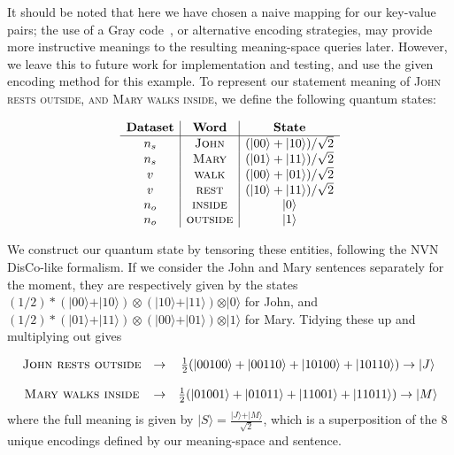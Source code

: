 It should be noted that here we have chosen a naive mapping for our key-value pairs; the use of a Gray code~\cite{gray_code}, or alternative encoding strategies, may provide more instructive meanings to the resulting meaning-space queries later. However, we leave this to future work for implementation and testing, and use the given encoding method for this example.
To represent our statement meaning of \textsc{John rests outside, and Mary walks inside}, we define the following quantum states:

\begin{equation*}
\begin{array}{c|c|c}
\mathbf{Dataset} & \mathbf{Word} & \mathbf{State} \\
\hline
{n_s} & \textsc{John} & (\vert 00 \rangle + \vert 10 \rangle)/\sqrt{2} \\
{n_s} & \textsc{Mary} & (\vert 01 \rangle + \vert 11 \rangle)/\sqrt{2} \\
{v} & \textsc{walk} & (\vert 00 \rangle + \vert 01 \rangle)/\sqrt{2} \\
{v} & \textsc{rest} & (\vert 10 \rangle + \vert 11 \rangle)/\sqrt{2} \\
{n_o} & \textsc{inside} & \vert 0 \rangle  \\
{n_o} & \textsc{outside} & \vert 1 \rangle  \\
\end{array}
\end{equation*}

We construct our quantum state by tensoring these entities, following the NVN DisCo-like formalism. If we consider the John and Mary sentences separately for the moment, they are respectively given by the states $(1/2)*(\vert 00 \rangle + \vert 10 \rangle)\otimes (\vert 10 \rangle + \vert 11 \rangle)\otimes \vert 0 \rangle$ for John, and $(1/2)*(\vert 01 \rangle + \vert 11 \rangle)\otimes (\vert 00 \rangle + \vert 01 \rangle)\otimes \vert 1 \rangle$ for Mary. Tidying these up and multiplying out gives 

\begin{equation*}
\begin{array}{ccc}
\textsc{John rests outside} & \rightarrow & \frac{1}{2}(\vert 00100 \rangle + \vert 00110 \rangle +\vert 10100 \rangle +\vert 10110 \rangle) \rightarrow \vert J\rangle \\
\\
\textsc{Mary walks inside} & \rightarrow & \frac{1}{2}(\vert 01001 \rangle + \vert 01011 \rangle +\vert 11001 \rangle +\vert 11011 \rangle) \rightarrow \vert M\rangle\\
\end{array}
\end{equation*}
where the full meaning is given by $\vert S\rangle = \frac{\vert J \rangle + \vert M \rangle}{\sqrt{2}}$, which is a superposition of the 8 unique encodings defined by our meaning-space and sentence. 

